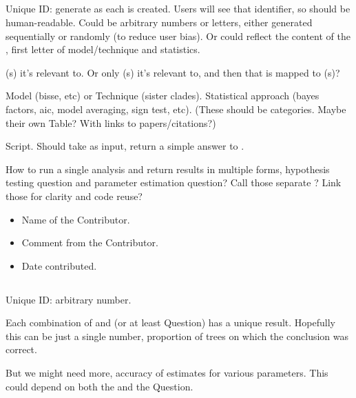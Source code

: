 \subsection{\Method}

Unique ID: generate as each \Method is created.
Users will see that identifier, so should be human-readable.
Could be arbitrary numbers or letters, either generated sequentially or randomly (to reduce user bias).
Or could reflect the content of the \Method, \eg first letter of model/technique and statistics.

\Task(s) it's relevant to.
Or only \Refset(s) it's relevant to, and then that is mapped to \Task(s)?

Model (bisse, etc) or Technique (sister clades).
Statistical approach (bayes factors, aic, model averaging, sign test, etc).
(These should be categories.  Maybe their own Table?  With links to papers/citations?)

Script.
Should take \Element as input, return a simple answer to \Task.

How to run a single analysis and return results in multiple forms, \eg hypothesis testing question and parameter estimation question?
Call those separate \Methods?  Link those \Methods for clarity and code reuse?

\begin{itemize}
    \item Name of the Contributor.
    \item Comment from the Contributor.
    \item Date contributed.
\end{itemize}

\subsection{\Performance}

Unique ID: arbitrary number.

Each combination of \Method and \Task (or at least Question) has a unique \Performance result.
Hopefully this can be just a single number, \eg proportion of trees on which the conclusion was correct.

But we might need more, \eg accuracy of estimates for various parameters.
This could depend on both the \Method and the Question.

